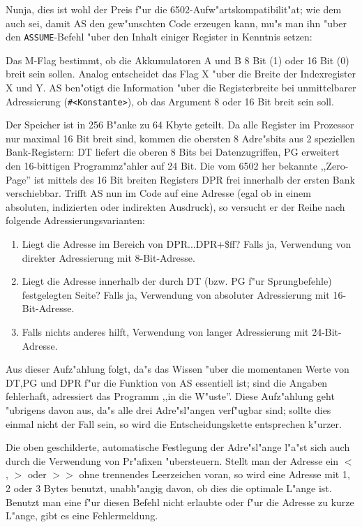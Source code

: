 \documentclass[12pt,a4paper,twoside]{report}
\newcommand{\tty}[1]{{\tt #1}}
\newcommand{\asname}{AS}
\begin{document}
Nunja, dies ist wohl der Preis f"ur die 6502-Aufw"artskompatibilit"at;
wie dem auch sei, damit \asname{} den gew"unschten Code erzeugen kann, mu"s
man ihn "uber den \tty{ASSUME}-Befehl "uber den Inhalt einiger
Register in Kenntnis setzen:
\par
Das M-Flag bestimmt, ob die Akkumulatoren A und B 8 Bit (1) oder 16 Bit
(0) breit sein sollen.  Analog entscheidet das Flag X "uber die Breite
der Indexregister X und Y.  \asname{} ben"otigt die Information "uber die
Registerbreite bei unmittelbarer Adressierung (\tty{\#<Konstante>}), ob das
Argument 8 oder 16 Bit breit sein soll.
\par
Der Speicher ist in 256 B"anke zu 64 Kbyte geteilt.  Da alle Register
im Prozessor nur maximal 16 Bit breit sind, kommen die obersten 8
Adre"sbits aus 2 speziellen Bank-Registern: DT liefert die oberen 8
Bits bei Datenzugriffen, PG erweitert den 16-bittigen Programmz"ahler
auf 24 Bit.  Die vom 6502 her bekannte ,,Zero-Page'' ist mittels
des 16 Bit breiten Registers DPR frei innerhalb der ersten Bank
verschiebbar.  Trifft \asname{} nun im Code auf eine Adresse (egal ob in
einem absoluten, indizierten oder indirekten Ausdruck), so versucht
er der Reihe nach folgende Adressierungsvarianten:
\begin{enumerate}
\item{Liegt die Adresse im Bereich von DPR...DPR+\$ff?  Falls ja,
      Verwendung von direkter Adressierung mit 8-Bit-Adresse.}
\item{Liegt die Adresse innerhalb der durch DT (bzw. PG f"ur
      Sprungbefehle) festgelegten Seite?  Falls ja, Verwendung von
      absoluter Adressierung mit 16-Bit-Adresse.}
\item{Falls nichts anderes hilft, Verwendung von langer Adressierung
      mit 24-Bit-Adresse.}
\end{enumerate}
Aus dieser Aufz"ahlung folgt, da"s das Wissen "uber die momentanen
Werte von DT,PG und DPR f"ur die Funktion von \asname{} essentiell ist;
sind die Angaben fehlerhaft, adressiert das Programm ,,in die W"uste''.
Diese Aufz"ahlung geht "ubrigens davon aus, da"s alle drei
Adre"sl"angen verf"ugbar sind; sollte dies einmal nicht der Fall sein,
so wird die Entscheidungskette entsprechen k"urzer.

Die oben geschilderte, automatische Festlegung der Adre"sl"ange l"a"st
sich auch durch die Verwendung von Pr"afixen "ubersteuern.  Stellt
man der Adresse ein $<$, $>$ oder $>>$ ohne trennendes Leerzeichen voran,
so wird eine Adresse mit 1, 2 oder 3 Bytes benutzt, unabh"angig davon,
ob dies die optimale L"ange ist.  Benutzt man eine f"ur diesen Befehl
nicht erlaubte oder f"ur die Adresse zu kurze L"ange, gibt es eine
Fehlermeldung.
\end{document}
